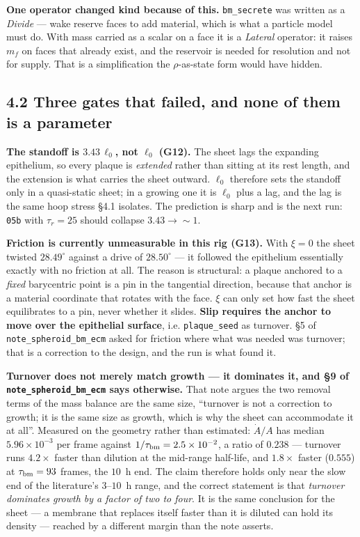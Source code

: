 \documentclass[10pt,a4paper]{article}
\newcommand{\code}[1]{\texttt{#1}}
\newcommand{\op}[1]{\texttt{#1}}
\begin{document}
\textbf{One operator changed kind because of this.} \op{bm\_secrete} was written as a \emph{Divide} ---
wake reserve faces to add material, which is what a particle model must do. With mass carried as a
scalar on a face it is a \emph{Lateral} operator: it raises $m_f$ on faces that already exist, and the
reservoir is needed for resolution and not for supply. That is a simplification the $\rho$-as-state form
would have hidden.

\subsection*{4.2\; Three gates that failed, and none of them is a parameter}


\textbf{The standoff is $3.43\,\ell_0$, not $\ell_0$ (G12).} The sheet lags the expanding epithelium, so
every plaque is \emph{extended} rather than sitting at its rest length, and the extension is what
carries the sheet outward. $\ell_0$ therefore sets the standoff only in a quasi-static sheet; in a
growing one it is $\ell_0$ plus a lag, and the lag is the same hoop stress \S4.1 isolates. The prediction
is sharp and is the next run: \op{05b} with $\tau_r=25$ should collapse $3.43\to\sim\!1$.

\textbf{Friction is currently unmeasurable in this rig (G13).} With $\xi=0$ the sheet twisted
$28.49^\circ$ against a drive of $28.50^\circ$ --- it followed the epithelium essentially exactly with
no friction at all. The reason is structural: a plaque anchored to a \emph{fixed} barycentric point is a
pin in the tangential direction, because that anchor is a material coordinate that rotates with the
face. $\xi$ can only set how fast the sheet equilibrates to a pin, never whether it slides.
\textbf{Slip requires the anchor to move over the epithelial surface}, i.e. \op{plaque\_seed} as
turnover. \S5 of \code{note\_spheroid\_bm\_ecm} asked for friction where what was needed was turnover;
that is a correction to the design, and the run is what found it.

\textbf{Turnover does not merely match growth --- it dominates it, and \S9 of
\code{note\_spheroid\_bm\_ecm} says otherwise.} That note argues the two removal terms of the mass
balance are the same size, ``turnover is not a correction to growth; it is the same size as growth,
which is why the sheet can accommodate it at all''. Measured on the geometry rather than estimated:
$\dot A/A$ has median $5.96\times10^{-3}$ per frame against $1/\tau_{\rm bm}=2.5\times10^{-2}$, a ratio
of $\mathbf{0.238}$ --- turnover runs $4.2\times$ faster than dilution at the mid-range half-life, and
$1.8\times$ faster ($0.555$) at $\tau_{\rm bm}=93$ frames, the $10$~h end. The claim therefore holds
only near the slow end of the literature's $3$--$10$~h range, and the correct statement is that
\emph{turnover dominates growth by a factor of two to four}. It is the same conclusion for the sheet ---
a membrane that replaces itself faster than it is diluted can hold its density --- reached by a
different margin than the note asserts.
\end{document}
